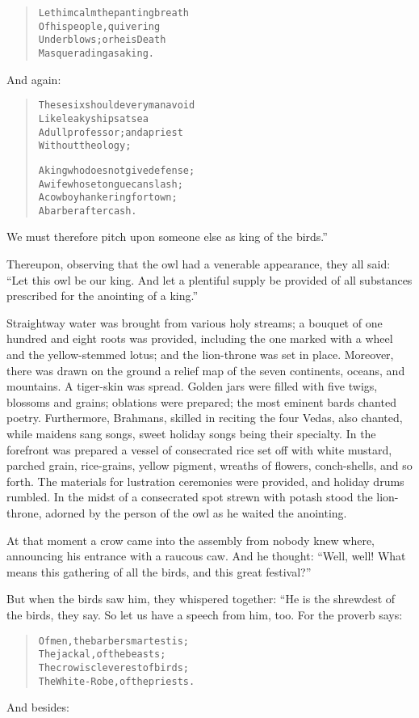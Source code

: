 \documentclass[article, twoside, 14pt]{memoir}
\renewenvironment{verbatim}{%
\begin{quote}%
\vskip -10pt%
\begin{alltt}\normalfont\large}{\end{alltt}%
\end{quote}%
\vskip -10pt
} %
\begin{document}
\begin{verbatim}
Let him calm the panting breath
    Of his people, quivering
Under blows; or he is Death
    Masquerading as a king.
\end{verbatim}
And again:

\begin{verbatim}
These six should every man avoid
    Like leaky ships at sea{\textemdash}
A dull professor; and a priest
    Without theology;

A king who does not give defense;
    A wife whose tongue can slash;
A cowboy hankering for town;
    A barber after cash.
\end{verbatim}
We must therefore pitch upon someone else as king of the birds.”

Thereupon, observing that the owl had a venerable appearance, they
all said:
``Let this owl be our king. And let a plentiful supply be provided of all substances prescribed for the anointing of a king.''

Straightway water was brought from various holy streams; a bouquet
of one hundred and eight roots was provided, including the one
marked with a wheel and the yellow-stemmed lotus; and the
lion-throne was set in place. Moreover, there was drawn on the
ground a relief map of the seven continents, oceans, and mountains.
A tiger-skin was spread. Golden jars were filled with five twigs,
blossoms and grains; oblations were prepared; the most eminent
bards chanted poetry. Furthermore, Brahmans, skilled in reciting
the four Vedas, also chanted, while maidens sang songs, sweet
holiday songs being their specialty. In the forefront was prepared
a vessel of consecrated rice set off with white mustard, parched
grain, rice-grains, yellow pigment, wreaths of flowers,
conch-shells, and so forth. The materials for lustration ceremonies
were provided, and holiday drums rumbled. In the midst of a
consecrated spot strewn with potash stood the lion-throne, adorned
by the person of the owl as he waited the anointing.

At that moment a crow came into the assembly from nobody knew
where, announcing his entrance with a raucous caw. And he thought:
``Well, well! What means this gathering of all the birds, and this great festival?''

But when the birds saw him, they whispered together: “He is the
shrewdest of the birds, they say. So let us have a speech from him,
too. For the proverb says:

\begin{verbatim}
Of men, the barber smartest is;
    The jackal, of the beasts;
The crow is cleverest of birds;
    The White-Robe, of the priests.
\end{verbatim}
And besides:
\end{document}
